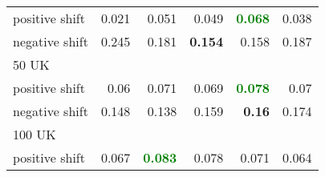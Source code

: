 \begin{table}[!ht]
{\begin{tabular}{lrrrrr}
positive shift           & \multicolumn{1}{r|}{0.021}          & 0.051                                                               & \multicolumn{1}{r|}{0.049}                                                   & \textbf{\textcolor{Green}{0.068}}                                                       & 0.038                                                                        \\
negative shift            & \multicolumn{1}{r|}{0.245}          & 0.181                                                               & \multicolumn{1}{r|}{\textbf{\textcolor{BrickRed}{0.154}} }                                          & 0.158                                                                & 0.187                                                                        \\ \midrule
\multicolumn{6}{l}{50 UK}                                                                                                                                                                                                                                                                                                                                             \\ \midrule
positive shift           & \multicolumn{1}{r|}{0.06}           & 0.071                                                               & \multicolumn{1}{r|}{0.069}                                                   & \textbf{\textcolor{Green}{0.078}}                                                        & 0.07                                                                         \\
negative shift            & \multicolumn{1}{r|}{0.148}          & 0.138                                                    & \multicolumn{1}{r|}{0.159}                                                   & \textbf{\textcolor{BrickRed}{0.16}}                                                                  & 0.174                                                                        \\ \midrule
\multicolumn{6}{l}{100 UK}                                                                                                                                                                                                                                                                                                                                            \\ \midrule
positive shift           & \multicolumn{1}{r|}{0.067}          & \textbf{\textcolor{Green}{0.083}}                                                        & \multicolumn{1}{r|}{0.078}                                                   & 0.071                                                                & 0.064                                                                        \\

\end{tabular}}
\end{table}
